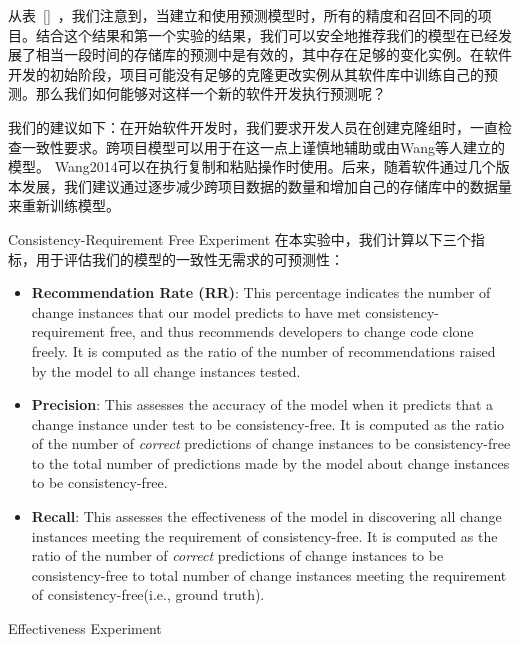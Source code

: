 从表~\ref{}~，我们注意到，当建立和使用预测模型时，所有的精度和召回不同的项目。结合这个结果和第一个实验的结果，我们可以安全地推荐我们的模型在已经发展了相当一段时间的存储库的预测中是有效的，其中存在足够的变化实例。在软件开发的初始阶段，项目可能没有足够的克隆更改实例从其软件库中训练自己的预测。那么我们如何能够对这样一个新的软件开发执行预测呢？

我们的建议如下：在开始软件开发时，我们要求开发人员在创建克隆组时，一直检查一致性要求。跨项目模型可以用于在这一点上谨慎地辅助或由Wang等人建立的模型。 \cite{} {Wang2014}可以在执行复制和粘贴操作时使用。后来，随着软件通过几个版本发展，我们建议通过逐步减少跨项目数据的数量和增加自己的存储库中的数据量来重新训练模型。

{Consistency-Requirement Free Experiment}
在本实验中，我们计算以下三个指标，用于评估我们的模型的一致性无需求的可预测性：
\begin{itemize}
\item \textbf{Recommendation Rate (RR)}: 
This percentage indicates the number of change instances that our model predicts to have met consistency-requirement free, and thus recommends developers to change code clone freely.
It is computed as the ratio of the number of recommendations raised by the model to all change instances tested.
\item \textbf{Precision}: 
This assesses the accuracy of the model when it predicts that a change instance under test to be consistency-free. It is computed as the ratio of the number of {\em correct} predictions of change instances to be consistency-free to the total number of predictions made by the model about change instances to be consistency-free.
\item \textbf{Recall}: 
This assesses the effectiveness of the model in discovering all change instances meeting the requirement of consistency-free.
It is computed as the ratio of the number of {\em correct} predictions of change instances to be consistency-free to total number of change instances meeting the requirement of consistency-free(i.e., ground truth).
\end{itemize}

{Effectiveness Experiment}

